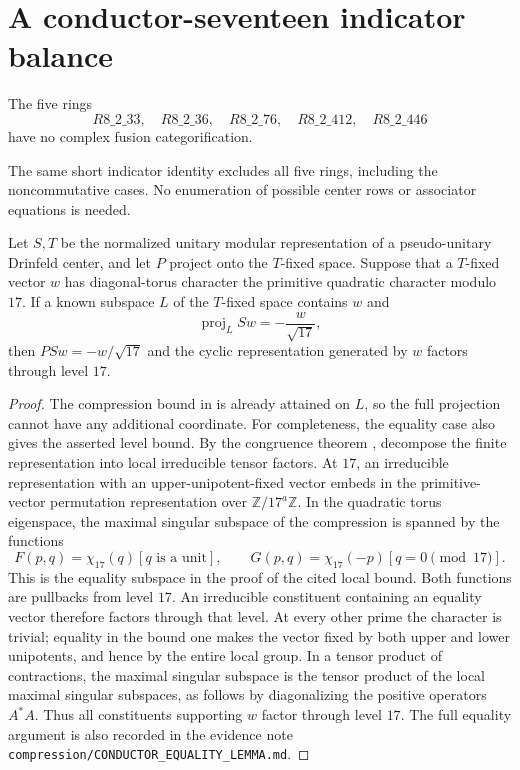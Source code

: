 \section{A conductor-seventeen indicator balance}
\label{sec:q17-indicator-balance}

\begin{theorem}\label{thm:q17-five-exclusions}
The five rings
\[
R8\_2\_33,\quad R8\_2\_36,\quad R8\_2\_76,\quad
R8\_2\_412,\quad R8\_2\_446
\]
have no complex fusion categorification.
\end{theorem}

The same short indicator identity excludes all five rings, including the
noncommutative cases. No enumeration of possible center rows or
associator equations is needed.

\begin{lemma}\label{lem:q17-conductor-equality}
Let $S,T$ be the normalized unitary modular representation of a
pseudo-unitary Drinfeld center, and let $P$ project onto the $T$-fixed
space. Suppose that a $T$-fixed vector $w$ has diagonal-torus character
the primitive quadratic character modulo $17$. If a known subspace
$L$ of the $T$-fixed space contains $w$ and
\[
\operatorname{proj}_L Sw=-\frac{w}{\sqrt{17}},
\]
then $PSw=-w/\sqrt{17}$ and the cyclic representation generated by $w$
factors through level $17$.
\end{lemma}
\begin{proof}
The compression bound in \cite[Lemma~4.1]{SchDimensionBlock} is already
attained on $L$, so the full projection cannot have any additional
coordinate. For completeness, the equality case also gives the asserted
level bound. By the congruence theorem \cite{NgCongruence}, decompose the
finite representation into local irreducible tensor factors. At $17$, an
irreducible representation with an upper-unipotent-fixed vector embeds
in the primitive-vector permutation representation over
$\mathbb Z/17^a\mathbb Z$. In the quadratic torus eigenspace, the
maximal singular subspace of the compression is spanned by the functions
\[
F(p,q)=\chi_{17}(q)[q\text{ is a unit}],\qquad
G(p,q)=\chi_{17}(-p)[q=0\pmod {17}].
\]
This is the equality subspace in the proof of the cited local bound.
Both functions are pullbacks from level $17$. An irreducible constituent
containing an equality vector therefore factors through that level.
At every other prime the character is trivial; equality in the bound
one makes the vector fixed by both upper and lower unipotents, and
hence by the entire local group. In a tensor product of contractions,
the maximal singular subspace is the tensor product of the local maximal
singular subspaces, as follows by diagonalizing the positive operators
$A^*A$. Thus all constituents supporting $w$ factor through level $17$.
The full equality argument is also recorded in the evidence note
\texttt{compression/CONDUCTOR\_EQUALITY\_LEMMA.md}.
\end{proof}

